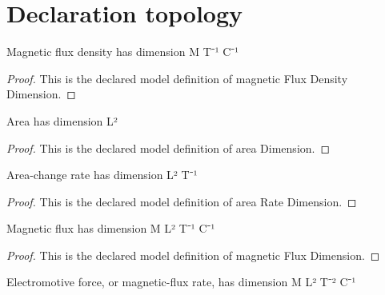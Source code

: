 \section{Declaration topology}
\begin{definition}
  \label{def:physics:phyx-mini-0918:phyxminiproblems-problemphyxmini0918-magneticfluxdensitydimension}
  Magnetic flux density has dimension M T⁻¹ C⁻¹
\end{definition}
\begin{proof}
  This is the declared model definition of magnetic Flux Density Dimension.
\end{proof}
\begin{definition}
  \label{def:physics:phyx-mini-0918:phyxminiproblems-problemphyxmini0918-areadimension}
  Area has dimension L²
\end{definition}
\begin{proof}
  This is the declared model definition of area Dimension.
\end{proof}
\begin{definition}
  \label{def:physics:phyx-mini-0918:phyxminiproblems-problemphyxmini0918-arearatedimension}
  Area-change rate has dimension L² T⁻¹
\end{definition}
\begin{proof}
  This is the declared model definition of area Rate Dimension.
\end{proof}
\begin{definition}
  \label{def:physics:phyx-mini-0918:phyxminiproblems-problemphyxmini0918-magneticfluxdimension}
  Magnetic flux has dimension M L² T⁻¹ C⁻¹
\end{definition}
\begin{proof}
  This is the declared model definition of magnetic Flux Dimension.
\end{proof}
\begin{definition}
  \label{def:physics:phyx-mini-0918:phyxminiproblems-problemphyxmini0918-electromotiveforcedimension}
  Electromotive force, or magnetic-flux rate, has dimension M L² T⁻² C⁻¹
\end{definition}
